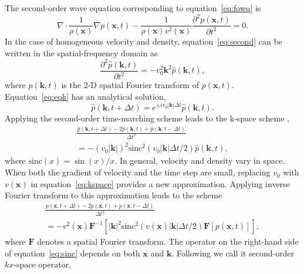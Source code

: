 The second-order wave equation corresponding to equation~\ref{eq:fowq} is 
\begin{equation}
\label{eq:second}
\nabla\cdot \frac{1}{\rho(\mathbf{x})}\nabla p(\mathbf{x},t) - \frac{1}{\rho(\mathbf{x})v^2(\mathbf{x})}\frac{\partial^2 p(\mathbf{x},t)}{\partial t^2} = 0.
\end{equation}
In the case of homogeneous velocity and density, equation~\ref{eq:second} can be written in the spatial-frequency domain as 
\begin{equation}
\label{eq:eqk}
\frac{\partial^2 \hat{p}(\mathbf{k},t)}{\partial t^2 } = -v^2_0\mathbf{k}^2\hat{p}(\mathbf{k},t),
\end{equation}
where $\hat{p}(\mathbf{k},t)$ is the 2-D spatial Fourier transform of $p(\mathbf{x},t)$. Equation~\ref{eq:eqk} has an analytical solution,
\begin{equation}
\label{eq:solution}
\hat{p}(\mathbf{k}, t+\Delta t) = e^{\pm iv_0\left|\mathbf{k}\right|\Delta t}\hat{p}(\mathbf{k},t).
\end{equation}
Applying the second-order time-marching scheme leads to the k-space scheme \cite[]{tabei},
\begin{equation}
\label{eq:kspace}
\begin{array}{c}
\displaystyle \frac{\hat{p}(\mathbf{k},t+\Delta t)-2\hat{p}(\mathbf{k},t)+\hat{p}(\mathbf{k},t-\Delta t)}{\Delta t^2} \\
= -(v_0\left|\mathbf{k}\right|)^2\mbox{sinc}^2(v_0\left|\mathbf{k}\right|\Delta t/2)\hat{p}(\mathbf{k},t),
\end{array}
\end{equation}  
where $\mbox{sinc}(x)=\sin(x)/x$. In general, velocity and density vary in space. When both the gradient of velocity and the time step are small, replacing $v_0$ with $v(\mathbf{x})$ in equation~\ref{eq:kspace} provides a new approximation. Applying inverse Fourier transform to this approximation leads to the scheme
\begin{equation}
\label{eq:sinc}
\begin{array}{c}
\displaystyle \frac{p(\mathbf{x},t+\Delta t) -2p(\mathbf{x},t) +p(\mathbf{x},t-\Delta t)}{\Delta t^2} \\
= -v^2(\mathbf{x})\mathbf{F}^{-1}\left[\left|\mathbf{k}\right|^2\mbox{sinc}^2(v(\mathbf{x})\left|\mathbf{k}\right|\Delta t/2)\mathbf{F}\left[p(\mathbf{x},t)\right]\right],
\end{array}
\end{equation}
where $\mathbf{F}$ denotes a spatial Fourier transform. The operator on the right-hand side of equation~\ref{eq:sinc} depends on both $\mathbf{x}$ and $\mathbf{k}$. Following \cite{tabei} we call it second-order $kx$-space operator, 
